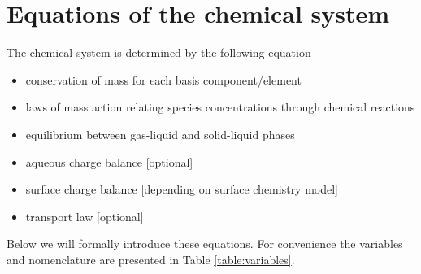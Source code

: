 \documentclass{article}
\begin{document}
\section{Equations of the chemical system}
The chemical system is determined by the following equation
\begin{itemize}
    \item conservation of mass for each basis component/element
    \item laws of mass action relating species concentrations through chemical reactions
    \item equilibrium between gas-liquid and solid-liquid phases
    \item aqueous charge balance [optional]
    \item surface charge balance [depending on surface chemistry model]
    \item transport law [optional]
\end{itemize}

Below we will formally introduce these equations. For convenience the variables and nomenclature are presented in Table \ref{table:variables}.
\end{document}
